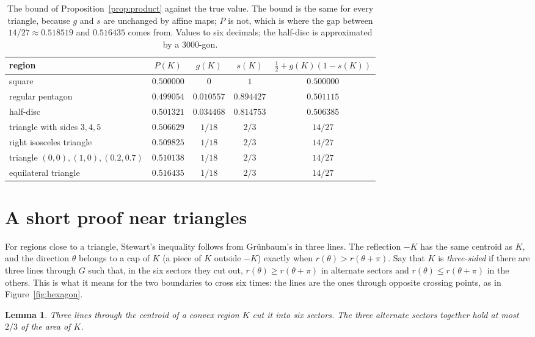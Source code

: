 \documentclass[11pt]{article}
\newtheorem{lemma}{Lemma}
\theoremstyle{remark}
\begin{document}
\begin{table}[ht]
\centering
\begin{tabular}{lcccc}
\toprule
region & $P(K)$ & $g(K)$ & $s(K)$ & $\tfrac12+g(K)(1-s(K))$\\
\midrule
square & $0.500000$ & $0$ & $1$ & $0.500000$\\
regular pentagon & $0.499054$ & $0.010557$ & $0.894427$ & $0.501115$\\
half-disc & $0.501321$ & $0.034468$ & $0.814753$ & $0.506385$\\
triangle with sides $3,4,5$ & $0.506629$ & $1/18$ & $2/3$ & $14/27$\\
right isosceles triangle & $0.509825$ & $1/18$ & $2/3$ & $14/27$\\
triangle $(0,0),(1,0),(0.2,0.7)$ & $0.510138$ & $1/18$ & $2/3$ & $14/27$\\
equilateral triangle & $0.516435$ & $1/18$ & $2/3$ & $14/27$\\
\bottomrule
\end{tabular}
\caption{The bound of Proposition~\ref{prop:product} against the true value. The bound is the same for
every triangle, because $g$ and $s$ are unchanged by affine maps; $P$ is not, which is where the gap
between $14/27\approx 0.518519$ and $0.516435$ comes from. Values to six decimals; the half-disc is
approximated by a $3000$-gon.}
\label{tab:values}
\end{table}

\section{A short proof near triangles}\label{sec:near}

For regions close to a triangle, Stewart's inequality follows from Gr\"unbaum's in three lines. The
reflection $-K$ has the same centroid as $K$, and the direction $\theta$ belongs to a cap of $K$ (a piece
of $K$ outside $-K$) exactly when $r(\theta)>r(\theta+\pi)$. Say that $K$ is \emph{three-sided} if there
are three lines through $G$ such that, in the six sectors they cut out, $r(\theta)\ge r(\theta+\pi)$ in
alternate sectors and $r(\theta)\le r(\theta+\pi)$ in the others. This is what it means for the two
boundaries to cross six times: the lines are the ones through opposite crossing points, as in
Figure~\ref{fig:hexagon}.

\begin{lemma}\label{lem:three}
Three lines through the centroid of a convex region $K$ cut it into six sectors. The three alternate
sectors together hold at most $2/3$ of the area of $K$.
\end{lemma}
\end{document}
